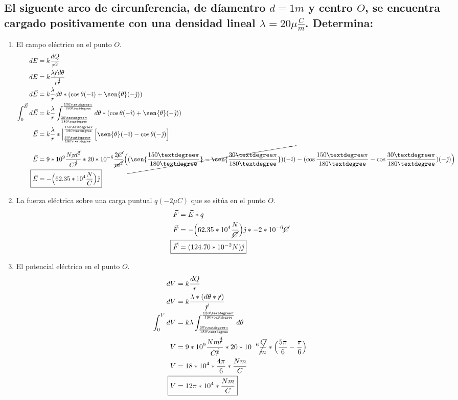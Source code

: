 \documentclass[10pt, twoside]{article}
\begin{document}
\subsection*{El siguente arco de circunferencia, de díamentro $d = 1m$ y centro $O$,
se encuentra cargado positivamente con una densidad lineal $\lambda = 20\mu \frac{C}{m}$.
Determina:}%
\begin{enumerate}[label=\textbf{\alph*)}]
	\item El campo eléctrico en el punto $O$.
		\begin{align*}
			dE &= k \frac{dQ}{r^2} \\
			dE &= k \frac{\lambda \cancel{r}d\theta}{r^{\cancel{2}} } \\
			d\vec{E} &= k \frac{\lambda}{r} d\theta*(\cos{\theta}(-\hat{\imath})+\sen{\theta}(-\hat{\jmath}))\\
			\int^{\vec{E}}_{0}d\vec{E} &= k \frac{\lambda}{r}
			\int^{\frac{150°\pi}{180°}}_{\frac{30°\pi}{180°}}d\theta*(\cos{\theta}(-\hat{\imath})+\sen{\theta}(-\hat{\jmath}))\\
			\vec{E} &= k \frac{\lambda}{r} *\Big{|}^{\frac{150°\pi}{180°}}_{\frac{30°\pi}{180°}}
			\Big{[}\sen{\theta}(-\hat{\imath})-\cos{\theta}(-\hat{\jmath})\Big{]}\\
			\vec{E} &= 9*10^9 \frac{N\cancel{m^2}}{C^{\cancel{2}} }*
			20*10^{-6} \frac{2\cancel{C}}{\cancel{m^2}}
			\Big{(}
			\cancel{(\sen{\frac{150°\pi}{180°}}-\sen{\frac{30°\pi}{180°}})(-\hat{\imath})}-
			(\cos{\frac{150°\pi}{180°}}-\cos{\frac{30°\pi}{180°}})(-\hat{\jmath})
			\Big{)}\\
			\Aboxed
			{
				\vec{E} &= -\Big{(}62.35*10^4 \frac{N}{C}\Big{)}\hat{\jmath}
			}
		\end{align*}
	\item La fuerza eléctrica sobre una carga puntual $q(-2\mu C)$ que se sitúa en el punto $O$.
		\begin{align*}
			\vec{F} &= \vec{E}*q\\
			\vec{F} &= -\Big{(}62.35*10^4 \frac{N}{\cancel{C}}\Big{)}\hat{\jmath}*-2*10^{-6}\cancel{C}\\
			\Aboxed
			{
				\vec{F} &= (124.70*10^{-2}N)\hat{\jmath}
			}
		\end{align*}
	\item El potencial eléctrico en el punto $O$.
		\begin{align*}
			dV &= k \frac{dQ}{r} \\
			dV &= k \frac{\lambda*(d\theta*\cancel{r})}{\cancel{r}}\\
			\int^V_0dV &= k \lambda \int^{\frac{150°\pi}{180°}}_{\frac{30°\pi}{180°}}d\theta\\
			V &= 9*10^9 \frac{Nm^{\cancel{2}} }{C^{\cancel{2}}}*20*10^{-6} \cancel{\frac{C}{m}}*\Big{(}
			\frac{5\pi}{6} - \frac{\pi}{6}
			\Big{)}\\
			V &= 18*10^4* \frac{4\pi}{6}* \frac{Nm}{C} \\
			\Aboxed
			{
				V &= 12\pi*10^4* \frac{Nm}{C}
			}
		\end{align*}
\end{enumerate}
\end{document}
